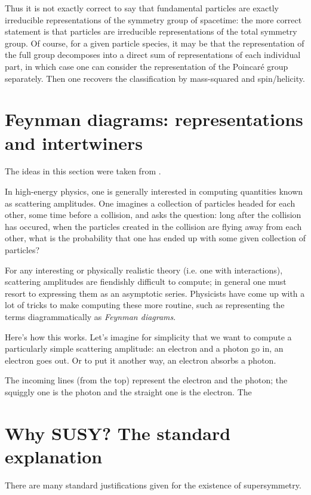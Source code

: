 \documentclass[a4paper,10pt]{scrreprt}
\theoremstyle{definition}
\theoremstyle{plain}
\theoremstyle{remark}
\begin{document}
Thus it is not exactly correct to say that fundamental particles are exactly irreducible representations of the symmetry group of spacetime: the more correct statement is that particles are irreducible representations of the total symmetry group. Of course, for a given particle species, it may be that the representation of the full group decomposes into a direct sum of representations of each individual part, in which case one can consider the representation of the Poincar\'{e} group separately. Then one recovers the classification by mass-squared and spin/helicity.

\section{Feynman diagrams: representations and intertwiners}
The ideas in this section were taken from \cite{baez-lauda-prehistory}.

In high-energy physics, one is generally interested in computing quantities known as scattering amplitudes. One imagines a collection of particles headed for each other, some time before a collision, and asks the question: long after the collision has occured, when the particles created in the collision are flying away from each other, what is the probability that one has ended up with some given collection of particles? 

For any interesting or physically realistic theory (i.e. one with interactions), scattering amplitudes are fiendishly difficult to compute; in general one must resort to expressing them as an asymptotic series. Physicists have come up with a lot of tricks to make computing these more routine, such as representing the terms diagrammatically as \emph{Feynman diagrams}.

Here's how this works. Let's imagine for simplicity that we want to compute a particularly simple scattering amplitude: an electron and a photon go in, an electron goes out. Or to put it another way, an electron absorbs a photon.

The incoming lines (from the top) represent the electron and the photon; the squiggly one is the photon and the straight one is the electron. The 


\section{Why SUSY? The standard explanation}
There are many standard justifications given for the existence of supersymmetry. 
\end{document}
